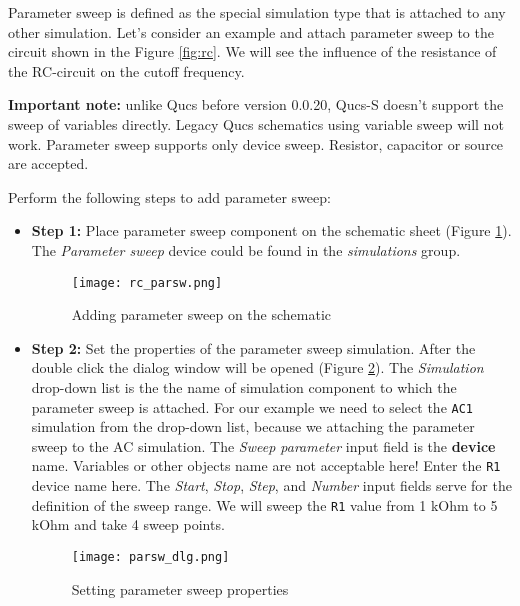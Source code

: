 Parameter sweep is defined as the special simulation type that is attached to any other simulation. Let's consider an example
and attach parameter sweep to the circuit shown in the Figure \ref{fig:rc}. We will see the influence of the resistance of
the RC-circuit on the cutoff frequency.

\textbf{Important note:} unlike Qucs before version 0.0.20, Qucs-S doesn't support the sweep of variables directly. Legacy Qucs schematics using variable sweep will not work. Parameter sweep supports only device sweep. Resistor, capacitor or source are accepted.

Perform the following steps to add parameter sweep:

\begin{itemize}
 \item \textbf{Step 1:} Place parameter sweep component on the schematic sheet (Figure \ref{fig:rc_parsw}).
 The \emph{Parameter sweep} device could be found in the \emph{simulations} group.

    \begin{figure}[!ht]
        \begin{center}
            \texttt{[image: rc\_parsw.png]}
        \end{center}
        \caption{Adding parameter sweep on the schematic}
    \label{fig:rc_parsw}
    \end{figure}

\item \textbf{Step 2:} Set the properties of the parameter sweep simulation. After the double click the dialog window will be
opened (Figure \ref{fig:parsw}). The \emph{Simulation} drop-down list is the the name of simulation component to which the parameter sweep is attached. For our example we need to select the \verb|AC1| simulation from the drop-down list, because we attaching the parameter sweep to the AC simulation. The \emph{Sweep parameter} input field is the \textbf{device} name. Variables or other objects
name are not acceptable here! Enter the \verb|R1| device name here. The \emph{Start}, \emph{Stop}, \emph{Step}, and \emph{Number} input fields serve for the definition of the sweep range. We will sweep the \verb|R1| value from 1 kOhm to 5 kOhm and take 4 sweep points.

    \begin{figure}[!ht]
        \begin{center}
            \texttt{[image: parsw\_dlg.png]}
        \end{center}
        \caption{Setting parameter sweep properties}
    \label{fig:parsw}
    \end{figure}


\end{itemize}
